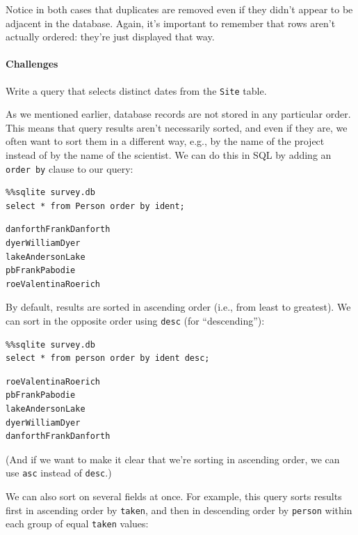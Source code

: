 \documentclass{book}
\begin{document}
Notice in both cases that duplicates are removed even if they didn't
appear to be adjacent in the database. Again, it's important to remember
that rows aren't actually ordered: they're just displayed that way.

\mbox{}\paragraph{Challenges}

\begin{swcenumerate}
\item
  Write a query that selects distinct dates from the \texttt{Site}
  table.
\end{swcenumerate}

As we mentioned earlier, database records are not stored in any
particular order. This means that query results aren't necessarily
sorted, and even if they are, we often want to sort them in a different
way, e.g., by the name of the project instead of by the name of the
scientist. We can do this in SQL by adding an \texttt{order by} clause
to our query:

\begin{verbatim}
%%sqlite survey.db
select * from Person order by ident;
\end{verbatim}

\begin{verbatim}
danforthFrankDanforth
dyerWilliamDyer
lakeAndersonLake
pbFrankPabodie
roeValentinaRoerich
\end{verbatim}

By default, results are sorted in ascending order (i.e., from least to
greatest). We can sort in the opposite order using \texttt{desc} (for
``descending''):

\begin{verbatim}
%%sqlite survey.db
select * from person order by ident desc;
\end{verbatim}

\begin{verbatim}
roeValentinaRoerich
pbFrankPabodie
lakeAndersonLake
dyerWilliamDyer
danforthFrankDanforth
\end{verbatim}

(And if we want to make it clear that we're sorting in ascending order,
we can use \texttt{asc} instead of \texttt{desc}.)

We can also sort on several fields at once. For example, this query
sorts results first in ascending order by \texttt{taken}, and then in
descending order by \texttt{person} within each group of equal
\texttt{taken} values:
\end{document}
